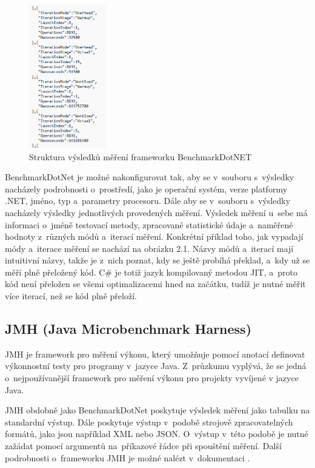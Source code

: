 \begin{figure}[!ht]
    \centering
    \includegraphics[width=0.3\textwidth]{../img/BenchmarkDotNET-modes.png}
    \caption{Struktura výsledků měření frameworku BenchmarkDotNET}
\end{figure}

BenchmarkDotNet je možné nakonfigurovat tak, aby se v~souboru s~výsledky nacházely podrobnosti o~prostředí, jako je operační systém,
verze platformy .NET, jméno, typ a~parametry procesoru. Dále aby se v~souboru s~výsledky nacházely
výsledky jednotlivých provedených měření. Výsledek měření u~sebe má informaci o~jméně
testovací metody, zpracované statistické údaje a~naměřené hodnoty z~různých módů a~iterací měření.
Konkrétní příklad toho, jak vypadají módy a~iterace měření se nachází na obrázku 2.1.
Názvy módů a~iterací mají intuitivní názvy, takže je z~nich poznat, kdy se ještě probíhá
překlad, a~kdy už se měří plně přeložený kód. C\# je totiž jazyk kompilovaný metodou JIT,
a~proto kód není přeložen se všemi optimalizacemi hned na začátku, tudíž je nutné měřit
více iterací, než se kód plně přeloží.

\subsection{JMH (Java Microbenchmark Harness)}

JMH je framework pro měření výkonu, který umožňuje pomocí anotací definovat výkonnostní testy
pro programy v~jazyce Java. Z~průzkumu \cite[]{unitTestingPerformanceSurvey} vyplývá, že se jedná o~nejpoužívanější framework
pro měření výkonu pro projekty vyvíjené v jazyce Java.

JMH obdobně jako BenchmarkDotNet poskytuje výsledek měření jako tabulku na standardní výstup.
Dále poskytuje výstup v~podobě strojově zpracovatelných formátů, jako jsou například XML
nebo JSON. O~výstup v~této podobě je nutné zažádat pomocí argumentů na~příkazové řádce při
spouštění měření. Další podrobnosti o~frameworku JMH je možné nalézt v~dokumentaci \cite[]{jmh}.

